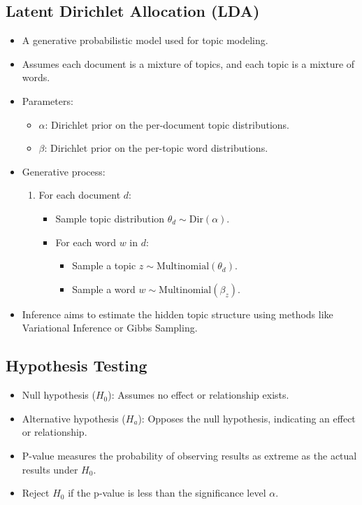 \documentclass[12pt,a4paper]{article}
\begin{document}
\subsection{Latent Dirichlet Allocation (LDA)}
\begin{itemize}
    \item A generative probabilistic model used for topic modeling.
    \item Assumes each document is a mixture of topics, and each topic is a mixture of words.
    \item Parameters:
    \begin{itemize}
        \item $\alpha$: Dirichlet prior on the per-document topic distributions.
        \item $\beta$: Dirichlet prior on the per-topic word distributions.
    \end{itemize}
    \item Generative process:
    \begin{enumerate}
        \item For each document $d$:
        \begin{itemize}
            \item Sample topic distribution $\theta_d \sim \text{Dir}(\alpha)$.
            \item For each word $w$ in $d$:
            \begin{itemize}
                \item Sample a topic $z \sim \text{Multinomial}(\theta_d)$.
                \item Sample a word $w \sim \text{Multinomial}(\beta_z)$.
            \end{itemize}
        \end{itemize}
    \end{enumerate}
    \item Inference aims to estimate the hidden topic structure using methods like Variational Inference or Gibbs Sampling.
\end{itemize}
\subsection{Hypothesis Testing}
\begin{itemize}
    \item Null hypothesis ($H_0$): Assumes no effect or relationship exists.
    \item Alternative hypothesis ($H_a$): Opposes the null hypothesis, indicating an effect or relationship.
    \item P-value measures the probability of observing results as extreme as the actual results under $H_0$.
    \item Reject $H_0$ if the p-value is less than the significance level $\alpha$.
\end{itemize}
\end{document}

